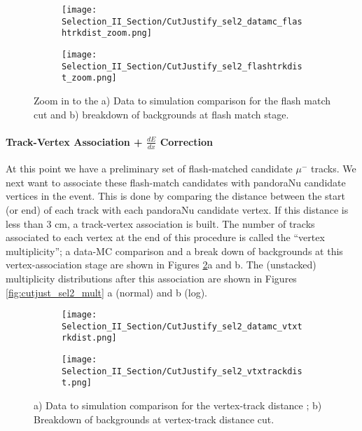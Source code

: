 \begin{figure}[h!]
\centering
  \begin{subfigure}[t]{0.4\textwidth}
    \centering
\texttt{[image: Selection\_II\_Section/CutJustify\_sel2\_datamc\_flashtrkdist\_zoom.png]}
    \caption{ }
  \end{subfigure} 
  \hspace{10 mm}
  \begin{subfigure}[t]{0.4\textwidth}
    \centering
\texttt{[image: Selection\_II\_Section/CutJustify\_sel2\_flashtrkdist\_zoom.png]}
   \caption{ }
  \end{subfigure} 
\caption{ Zoom in to the a) Data to simulation comparison for the flash match cut and b) breakdown of backgrounds at flash match stage. }
\label{fig:cutjust_sel2_flashtrkdist_zoom}
\end{figure}

\paragraph{Track-Vertex Association + $\frac{dE}{dx}$ Correction}
At this point we have a preliminary set of flash-matched candidate $\mu^-$ tracks. We next want to associate these flash-match candidates with pandoraNu candidate vertices in the event. This is done by comparing the distance between the start (or end) of each track with each pandoraNu candidate vertex. If this distance is less than 3 cm, a track-vertex association is built.  The number of tracks associated to each vertex at the end of this procedure is called the ``vertex multiplicity''; a data-MC comparison and a break down of backgrounds at this vertex-association stage are shown in Figures \ref{fig:cutjust_sel2_vtxtrackdist}a and b.  The (unstacked) multiplicity distributions after this association are shown in Figures \ref{fig:cutjust_sel2_mult} a (normal) and b (log).

\begin{figure}[h!]
\centering
  \begin{subfigure}[t]{0.4\textwidth}
    \centering
\texttt{[image: Selection\_II\_Section/CutJustify\_sel2\_datamc\_vtxtrkdist.png]}
    \caption{ }
  \end{subfigure} 
  \hspace{10 mm}
  \begin{subfigure}[t]{0.4\textwidth}
    \centering
\texttt{[image: Selection\_II\_Section/CutJustify\_sel2\_vtxtrackdist.png]}
    \caption{ }
  \end{subfigure} 
\caption{ a) Data to simulation comparison for the vertex-track distance ; b) Breakdown of backgrounds at vertex-track distance cut. }
\label{fig:cutjust_sel2_vtxtrackdist}
\end{figure}


